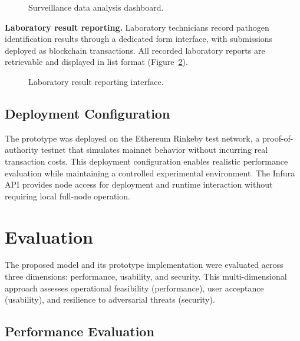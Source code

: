 \documentclass[AMA,LATO1COL]{WileyNJD-v2}
\begin{document}
\begin{figure}[!ht]
\centering
{}
\caption{Surveillance data analysis dashboard.}\label{fig:analysis}
\end{figure}

\textbf{Laboratory result reporting.} Laboratory technicians record pathogen identification results through a dedicated form interface, with submissions deployed as blockchain transactions. All recorded laboratory reports are retrievable and displayed in list format (Figure~\ref{fig:lab}).

\begin{figure}[!ht]
\centering
{}
\caption{Laboratory result reporting interface.}\label{fig:lab}
\end{figure}

\subsection{Deployment Configuration}\label{subsec:deployment}

The prototype was deployed on the Ethereum Rinkeby test network, a proof-of-authority testnet that simulates mainnet behavior without incurring real transaction costs. This deployment configuration enables realistic performance evaluation while maintaining a controlled experimental environment. The Infura API provides node access for deployment and runtime interaction without requiring local full-node operation.

\section{Evaluation}\label{sec:evaluation}

The proposed model and its prototype implementation were evaluated across three dimensions: performance, usability, and security. This multi-dimensional approach assesses operational feasibility (performance), user acceptance (usability), and resilience to adversarial threats (security).

\subsection{Performance Evaluation}\label{subsec:performance}
\end{document}
